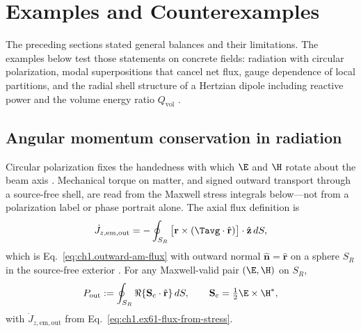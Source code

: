 \section{Examples and Counterexamples}
\label{sec:ch01.6}

The preceding sections stated general balances and their limitations. The examples below test those statements on concrete fields: radiation with circular polarization, modal superpositions that cancel net flux, gauge dependence of local partitions, and the radial shell structure of a Hertzian dipole including reactive power and the volume energy ratio $Q_{\mathrm{vol}}$ \cite{stratton1941,beth1936,allen1992,chu1948,mcclean1996}.

\subsection{Angular momentum conservation in radiation}
\label{sec:ch01.6.1}

Circular polarization fixes the handedness with which $\E$ and $\H$ rotate about the beam axis \cite{stratton1941,beth1936}. Mechanical torque on matter, and signed outward transport through a source-free shell, are read from the Maxwell stress integrals below---not from a polarization label or phase portrait alone. The axial flux definition is
\begin{equation}
\label{eq:ch1.ex61-flux-from-stress}
\dot J_{z,\mathrm{em,out}}
=-\oint_{S_R}\big[\mathbf{r}\times(\Tavg\cdot\hat{\mathbf{r}})\big]\cdot\hat{\mathbf{z}}\,dS,
\end{equation}
which is Eq.~\eqref{eq:ch1.outward-am-flux} with outward normal $\hat{\mathbf{n}}=\hat{\mathbf{r}}$ on a sphere $S_R$ in the source-free exterior \cite{stratton1941,beth1936}. For any Maxwell-valid pair $(\E,\H)$ on $S_R$,
\begin{equation}
\label{eq:ch1.ex61-power-def}
P_{\mathrm{out}}:=\oint_{S_R}\Re\{\mathbf{S}_\mathrm{c}\cdot\hat{\mathbf{r}}\}\,dS,\qquad
\mathbf{S}_\mathrm{c}=\tfrac12\E\times\H^*,
\end{equation}
with $\dot J_{z,\mathrm{em,out}}$ from Eq.~\eqref{eq:ch1.ex61-flux-from-stress}.

